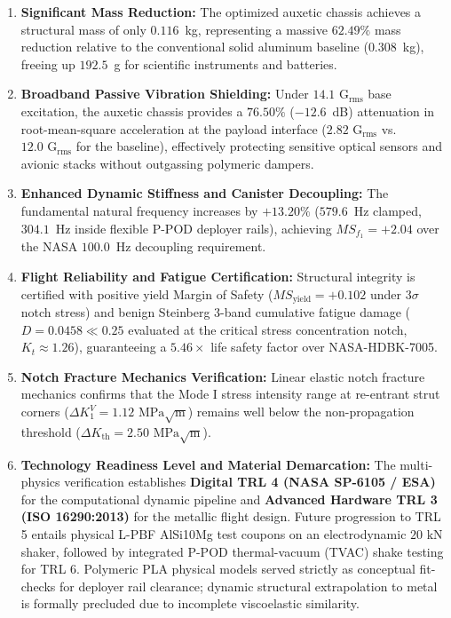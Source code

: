 \documentclass[preprint,12pt,3p]{elsarticle}
\begin{document}
\begin{enumerate}
  \item \textbf{Significant Mass Reduction:} The optimized auxetic chassis achieves a structural mass of only $0.116$~kg, representing a massive $62.49\%$ mass reduction relative to the conventional solid aluminum baseline ($0.308$~kg), freeing up $192.5$~g for scientific instruments and batteries.
  \item \textbf{Broadband Passive Vibration Shielding:} Under $14.1\text{ G}_{\text{rms}}$ base excitation, the auxetic chassis provides a $76.50\%$ ($-12.6$~dB) attenuation in root-mean-square acceleration at the payload interface ($2.82\text{ G}_{\text{rms}}$ vs. $12.0\text{ G}_{\text{rms}}$ for the baseline), effectively protecting sensitive optical sensors and avionic stacks without outgassing polymeric dampers.
  \item \textbf{Enhanced Dynamic Stiffness and Canister Decoupling:} The fundamental natural frequency increases by $+13.20\%$ ($579.6$~Hz clamped, $304.1$~Hz inside flexible P-POD deployer rails), achieving $MS_{f_1} = +2.04$ over the NASA $100.0$~Hz decoupling requirement.
  \item \textbf{Flight Reliability and Fatigue Certification:} Structural integrity is certified with positive yield Margin of Safety ($MS_{\text{yield}} = +0.102$ under $3\sigma$ notch stress) and benign Steinberg 3-band cumulative fatigue damage ($D = 0.0458 \ll 0.25$ evaluated at the critical stress concentration notch, $K_t \approx 1.26$), guaranteeing a $5.46\times$ life safety factor over NASA-HDBK-7005.
  \item \textbf{Notch Fracture Mechanics Verification:} Linear elastic notch fracture mechanics confirms that the Mode I stress intensity range at re-entrant strut corners ($\Delta K_1^V = 1.12\text{ MPa}\sqrt{\text{m}}$) remains well below the non-propagation threshold ($\Delta K_{\text{th}} = 2.50\text{ MPa}\sqrt{\text{m}}$).
  \item \textbf{Technology Readiness Level and Material Demarcation:} The multi-physics verification establishes \textbf{Digital TRL 4 (NASA SP-6105 / ESA)} for the computational dynamic pipeline and \textbf{Advanced Hardware TRL 3 (ISO 16290:2013)} for the metallic flight design. Future progression to TRL 5 entails physical L-PBF AlSi10Mg test coupons on an electrodynamic $20\text{ kN}$ shaker, followed by integrated P-POD thermal-vacuum (TVAC) shake testing for TRL 6. Polymeric PLA physical models served strictly as conceptual fit-checks for deployer rail clearance; dynamic structural extrapolation to metal is formally precluded due to incomplete viscoelastic similarity.
\end{enumerate}
\end{document}
